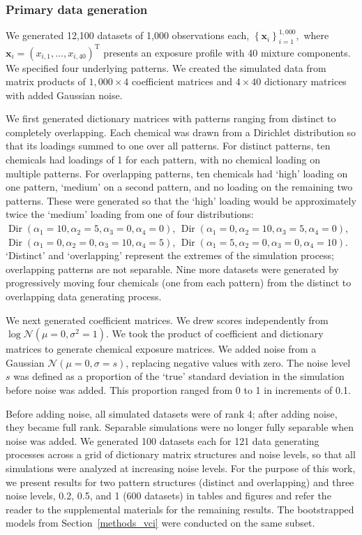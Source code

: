 \subsubsection{Primary data generation} 
We generated 12,100 datasets of 1,000 observations each, $\left\{\mathbf{x}_{i}\right\}_{i=1}^{1,000},$ where $\mathbf{x}_{i} = \left(x_{i,1}, \ldots, x_{i,40}\right)^{\mathrm{T}}$ presents an exposure profile with 40 mixture components. We specified four underlying patterns. We created the simulated data from matrix products of $1,000 \times 4$ coefficient matrices and $4 \times 40$ dictionary matrices with added Gaussian noise.

We first generated dictionary matrices with patterns ranging from distinct to completely overlapping. Each chemical was drawn from a Dirichlet distribution so that its loadings summed to one over all patterns. For distinct patterns, ten chemicals had loadings of 1 for each pattern, with no chemical loading on multiple patterns. For overlapping patterns, ten chemicals had `high' loading on one pattern, `medium' on a second pattern, and no loading on the remaining two patterns. These were generated so that the `high' loading would be approximately twice the `medium' loading from one of four distributions: $\operatorname{Dir}(\alpha_1=10, \alpha_2=5, \alpha_3=0, \alpha_4=0)$, $\operatorname{Dir}(\alpha_1=0, \alpha_2=10, \alpha_3=5, \alpha_4=0)$, $\operatorname{Dir}(\alpha_1=0, \alpha_2=0, \alpha_3=10, \alpha_4=5)$, $\operatorname{Dir}(\alpha_1=5, \alpha_2=0, \alpha_3=0, \alpha_4=10)$. `Distinct' and `overlapping' represent the extremes of the simulation process; overlapping patterns are not separable. Nine more datasets were generated by progressively moving four chemicals (one from each pattern) from the distinct to overlapping data generating process.

We next generated coefficient matrices. We drew scores independently from $\log\mathcal{N}(\mu = 0, \sigma^{2} = 1)$. We took the product of coefficient and dictionary matrices to generate chemical exposure matrices. We added noise from a Gaussian $\mathcal{N}(\mu = 0, \sigma = s)$, replacing negative values with zero. The noise level $s$ was defined as a proportion of the `true' standard deviation in the simulation before noise was added. This proportion ranged from 0 to 1 in increments of 0.1. 

Before adding noise, all simulated datasets were of rank 4; after adding noise, they became full rank. Separable simulations were no longer fully separable when noise was added. We generated 100 datasets each for 121 data generating processes across a grid of dictionary matrix structures and noise levels, so that all simulations were analyzed at increasing noise levels. For the purpose of this work, we present results for two pattern structures (distinct and overlapping) and three noise levels, 0.2, 0.5, and 1 (600 datasets) in tables and figures and refer the reader to the supplemental materials for the remaining results. The bootstrapped models from Section~\ref{methods_vci} were conducted on the same subset.

